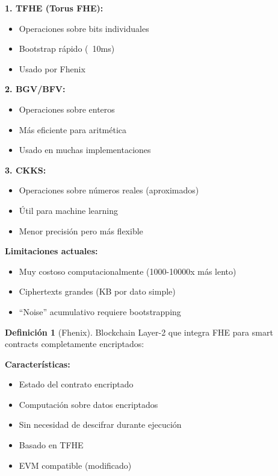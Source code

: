 \documentclass[11pt,a4paper,twoside]{book}
\theoremstyle{definition}
\newtheorem{definition}{Definición}[chapter]
\theoremstyle{remark}
\begin{document}
\begin{mathnote}
\textbf{1. TFHE (Torus FHE):}
\begin{itemize}
    \item Operaciones sobre bits individuales
    \item Bootstrap rápido (~10ms)
    \item Usado por Fhenix
\end{itemize}

\textbf{2. BGV/BFV:}
\begin{itemize}
    \item Operaciones sobre enteros
    \item Más eficiente para aritmética
    \item Usado en muchas implementaciones
\end{itemize}

\textbf{3. CKKS:}
\begin{itemize}
    \item Operaciones sobre números reales (aproximados)
    \item Útil para machine learning
    \item Menor precisión pero más flexible
\end{itemize}

\textbf{Limitaciones actuales:}
\begin{itemize}
    \item Muy costoso computacionalmente (1000-10000x más lento)
    \item Ciphertexts grandes (KB por dato simple)
    \item ``Noise'' acumulativo requiere bootstrapping
\end{itemize}
\end{mathnote}

\begin{definition}[Fhenix]
Blockchain Layer-2 que integra FHE para smart contracts completamente encriptados:

\textbf{Características:}
\begin{itemize}
    \item Estado del contrato encriptado
    \item Computación sobre datos encriptados
    \item Sin necesidad de descifrar durante ejecución
    \item Basado en TFHE
    \item EVM compatible (modificado)
\end{itemize}
\end{definition}
\end{document}
